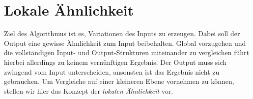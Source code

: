 \section{Lokale Ähnlichkeit}
Ziel des Algorithmus ist es, Variationen des Inputs zu erzeugen. Dabei soll der Output eine gewisse Ähnlichkeit zum Input beibehalten. Global
vorzugehen und die vollständigen Input- und Output-Strukturen miteinander zu vergleichen führt hierbei allerdings zu keinem vernünftigen
Ergebnis. Der Output muss sich zwingend vom Input unterscheiden, ansonsten ist das Ergebnis nicht zu gebrauchen. Um Vergleiche auf einer kleineren
Ebene vornehmen zu können, stellen wir hier das Konzept der \textit{lokalen Ähnlichkeit} vor.